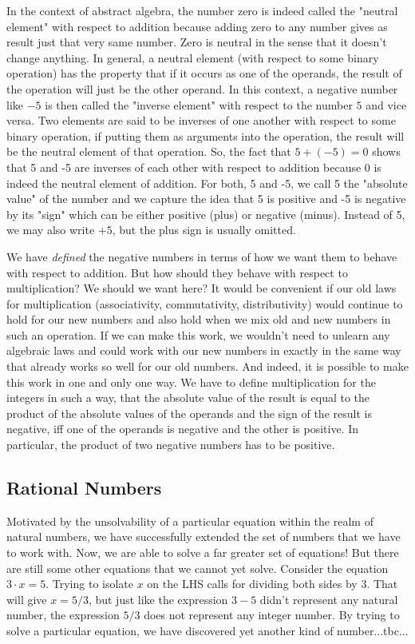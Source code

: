 \medskip
In the context of abstract algebra, the number zero is indeed called the "neutral element" with respect to addition because adding zero to any number gives as result just that very same number. Zero is neutral in the sense that it doesn't change anything. In general, a neutral element (with respect to some binary operation) has the property that if it occurs as one of the operands, the result of the operation will just be the other operand. In this context, a negative number like $-5$ is then called the "inverse element" with respect to the number $5$ and vice versa. Two elements are said to be inverses of one another with respect to some binary operation, if putting them as arguments into the operation, the result will be the neutral element of that operation. So, the fact that $5 + (-5) = 0$ shows that 5 and -5 are inverses of each other with respect to addition because 0 is indeed the neutral element of addition. For both, 5 and -5, we call 5 the "absolute value" of the number and we capture the idea that 5 is positive and -5 is negative by its "sign" which can be either positive (plus) or negative (minus). Instead of 5, we may also write $+5$, but the plus sign is usually omitted.

\medskip
We have \emph{defined} the negative numbers in terms of how we want them to behave with respect to addition. But how should they behave with respect to multiplication? We should we want here? It would be convenient if our old laws for multiplication (associativity, commutativity, distributivity) would continue to hold for our new numbers and also hold when we mix old and new numbers in such an operation. If we can make this work, we wouldn't need to unlearn any algebraic laws and could work with our new numbers in exactly in the same way that already works so well for our old numbers. And indeed, it is possible to make this work in one and only one way. We have to define multiplication for the integers in such a way, that the absolute value of the result is equal to the product of the absolute values of the operands and the sign of the result is negative, iff one of the operands is negative and the other is positive. In particular, the product of two negative numbers has to be positive.


\subsection{Rational Numbers}
Motivated by the unsolvability of a particular equation within the realm of natural numbers, we have successfully extended the set of numbers that we have to work with. Now, we are able to solve a far greater set of equations! But there are still some other equations that we cannot yet solve. Consider the equation $3 \cdot x = 5$. Trying to isolate $x$ on the LHS calls for dividing both sides by 3. That will give $x = 5/3$, but just like the expression $3-5$ didn't represent any natural number, the expression $5/3$ does not represent any integer number. By trying to solve a particular equation, we have discovered yet another kind of number...tbc...

